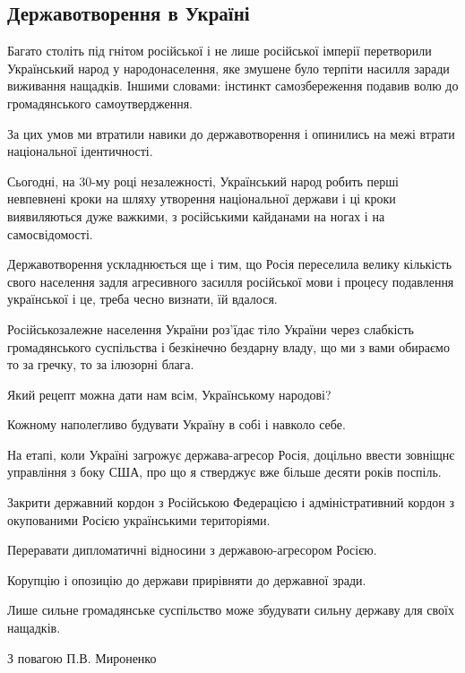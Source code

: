  
 
 
 
 

\subsection{Державотворення в Україні}

Багато століть під гнітом російської і не лише російської імперії перетворили
Український народ у народонаселення, яке змушене було терпіти насилля заради
виживання нащадків. Іншими словами: інстинкт самозбереження подавив волю до
громадянського самоутвердження.

За цих умов ми втратили навики до державотворення і опинились на межі втрати
національної ідентичності.

Сьогодні, на 30-му році незалежності, Український народ робить перші невпевнені
кроки на шляху утворення національної держави і ці кроки виявиляються дуже
важкими, з російськими кайданами на ногах і на самосвідомості.

Державотворення ускладнюється ще і тим, що Росія переселила велику кількість
свого населення задля агресивного засилля російської мови і процесу подавлення
української і це, треба чесно визнати, їй вдалося.

Російськозалежне населення України роз'їдає тіло України через слабкість
громадянського суспільства і безкінечно бездарну владу, що ми з вами обираємо
то за гречку, то за ілюзорні блага.

Який рецепт можна дати нам всім, Українському народові? 

Кожному наполегливо будувати Україну в собі і навколо себе.

На етапі, коли Україні загрожує держава-агресор Росія, доцільно ввести зовніщнє
управління з боку США, про що я стверджує вже більше десяти років поспіль.

Закрити державний кордон з Російською Федерацією і адміністративний кордон з
окупованими Росією українськими територіями.

Переравати дипломатичні відносини з державою-агресором Росією.

Корупцію і опозицію до держави прирівняти до державної зради.

Лише сильне громадянське суспільство може збудувати сильну державу для своїх нащадків.

З повагою П.В. Мироненко

